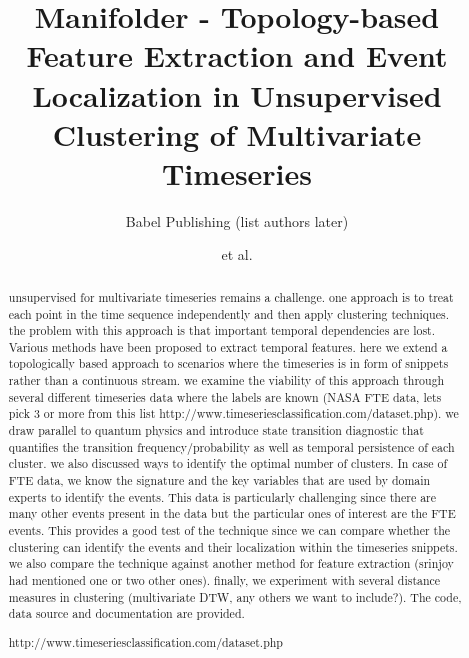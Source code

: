 \documentclass[aps,preprint,superscriptaddress]{revtex4}
\begin{document}
\title{Manifolder - Topology-based Feature Extraction and Event Localization in Unsupervised Clustering of Multivariate Timeseries}

\author{Babel Publishing (list authors later)}
\author{et al.}


\begin{abstract}

unsupervised for multivariate timeseries remains a challenge. one approach is to treat each point in the time sequence independently and then apply clustering techniques. the problem with this approach is that important temporal dependencies are lost. Various methods have been proposed to extract temporal features. here we extend a topologically based approach to scenarios where the timeseries is in form of snippets rather than a continuous stream. we examine the viability of this approach through several different timeseries data where the labels are known (NASA FTE data, lets pick 3 or more from this list http://www.timeseriesclassification.com/dataset.php). we draw parallel to quantum physics and introduce state transition diagnostic that quantifies the transition frequency/probability as well as temporal persistence of each cluster. we also discussed ways to identify the optimal number of clusters. In case of FTE data, we know the signature and the key variables that are used by domain experts to identify the events. This data is particularly challenging since there are many other events present in the data but the particular ones of interest are the FTE events. This provides a good test of the technique since we can compare whether the clustering can identify the events and their localization within the timeseries snippets.
we also compare the technique against another method for feature extraction (srinjoy had mentioned one or two other ones). finally, we experiment with several distance measures in clustering (multivariate DTW, any others we want to include?). 
The code, data source and documentation are provided.

http://www.timeseriesclassification.com/dataset.php

\end{abstract}

\maketitle

\end{document}
